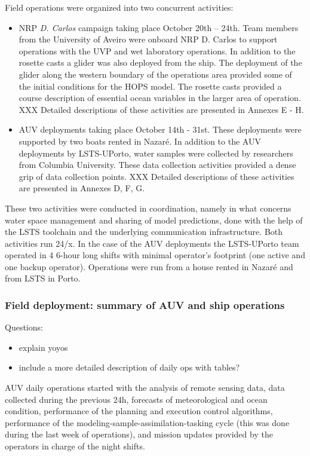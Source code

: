 Field operations were organized into two concurrent activities:

\begin{itemize}
\item NRP \emph{D. Carlos} campaign taking place October 20th – 24th.
  Team members from the University of Aveiro were onboard NRP D. Carlos
  to support operations with the UVP and wet laboratory operations. In
  addition to the rosette casts a glider was also deployed from the
  ship. The deployment of the glider along the western boundary of the
  operations area provided some of the initial conditions for the HOPS
  model. The rosette casts provided a course description of essential
  ocean variables in the larger area of operation. XXX Detailed
  descriptions of these activities are presented in Annexes E - H.

\item AUV deployments taking place October 14th - 31st. These
  deployments were supported by two boats rented in Nazaré. In addition
  to the AUV deployments by LSTS-UPorto, water samples were collected by
  researchers from Columbia University. These data collection activities
  provided a dense grip of data collection points. XXX Detailed
  descriptions of these activities are presented in Annexes D, F, G.

\end{itemize}

These two activities were conducted in coordination, namely in what
concerns water space management and sharing of model predictions, done
with the help of the LSTS toolchain and the underlying communication
infrastructure. Both activities run 24/x. In the case of the AUV
deployments the LSTS-UPorto team operated in 4 6-hour long shifts with
minimal operator’s footprint (one active and one backup operator).
Operations were run from a house rented in Nazaré and from LSTS in
Porto.


\subsubsection{Field deployment: summary of AUV and ship operations}

Questions:
\begin{itemize}
    \item explain yoyos
    \item include a more detailed description of daily ops with tables?
\end{itemize}


AUV daily operations started with the analysis of remote sensing data,
data collected during the previous 24h, forecasts of meteorological and
ocean condition, performance of the planning and execution control
algorithms, performance of the modeling-sample-assimilation-tasking
cycle (this was done during the last week of operations), and mission
updates provided by the operators in charge of the night shifts.

